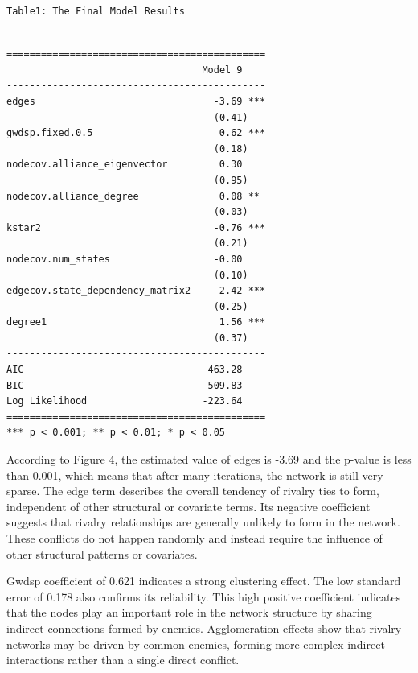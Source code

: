 \documentclass[
]{article}
\begin{document}
\begin{verbatim}
Table1: The Final Model Results
\end{verbatim}

\begin{verbatim}

=============================================
                                  Model 9    
---------------------------------------------
edges                               -3.69 ***
                                    (0.41)   
gwdsp.fixed.0.5                      0.62 ***
                                    (0.18)   
nodecov.alliance_eigenvector         0.30    
                                    (0.95)   
nodecov.alliance_degree              0.08 ** 
                                    (0.03)   
kstar2                              -0.76 ***
                                    (0.21)   
nodecov.num_states                  -0.00    
                                    (0.10)   
edgecov.state_dependency_matrix2     2.42 ***
                                    (0.25)   
degree1                              1.56 ***
                                    (0.37)   
---------------------------------------------
AIC                                463.28    
BIC                                509.83    
Log Likelihood                    -223.64    
=============================================
*** p < 0.001; ** p < 0.01; * p < 0.05
\end{verbatim}

According to Figure 4, the estimated value of edges is -3.69 and the
p-value is less than 0.001, which means that after many iterations, the
network is still very sparse. The edge term describes the overall
tendency of rivalry ties to form, independent of other structural or
covariate terms. Its negative coefficient suggests that rivalry
relationships are generally unlikely to form in the network. These
conflicts do not happen randomly and instead require the influence of
other structural patterns or covariates.

Gwdsp coefficient of 0.621 indicates a strong clustering effect. The low
standard error of 0.178 also confirms its reliability. This high
positive coefficient indicates that the nodes play an important role in
the network structure by sharing indirect connections formed by enemies.
Agglomeration effects show that rivalry networks may be driven by common
enemies, forming more complex indirect interactions rather than a single
direct conflict.
\end{document}
